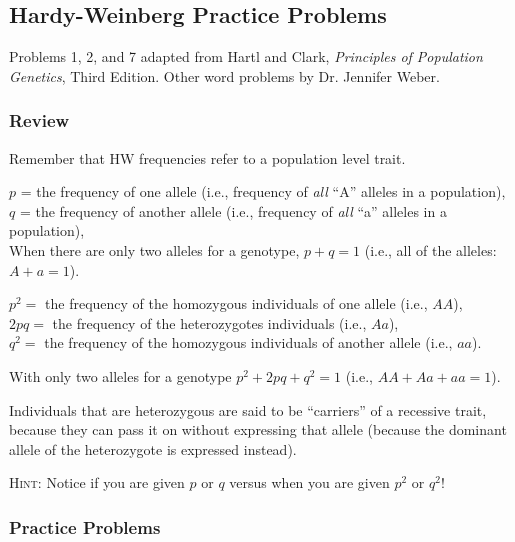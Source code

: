 \documentclass[12pt]{exam}
\begin{document}
\subsection*{Hardy-Weinberg Practice Problems}

Problems 1, 2, and 7 adapted from Hartl and Clark, \textit{Principles of Population Genetics}, Third Edition. Other word problems by Dr. Jennifer Weber.


\subsubsection*{Review}

Remember that HW frequencies refer to a population level trait.

$p$ = the frequency of one allele (i.e., frequency of \emph{all} “A” alleles in a population), \\
$q$ = the frequency of another allele (i.e., frequency of \emph{all} “a” alleles in a population),\\
When there are only two alleles for a genotype, $p + q = 1$ (i.e., all of the alleles: $A + a = 1$).

$p^2 =$ the frequency of the homozygous individuals of one allele (i.e., $AA$), \\
$2pq =$ the frequency of the heterozygotes individuals (i.e., $Aa$), \\
$q^2 =$ the frequency of the homozygous individuals of another allele (i.e., $aa$).

With only two alleles for a genotype $p^2 +2pq + q^2 = 1$ (i.e., $AA + Aa + aa = 1$).

Individuals that are heterozygous are said to be “carriers” of a recessive trait, because they can pass it on without expressing that allele (because the dominant allele of the heterozygote is expressed instead).

\textsc{Hint:} Notice if you are given $p$ or $q$ versus when you are given $p^2$ or $q^2$!

\subsubsection*{Practice Problems}
\end{document}
